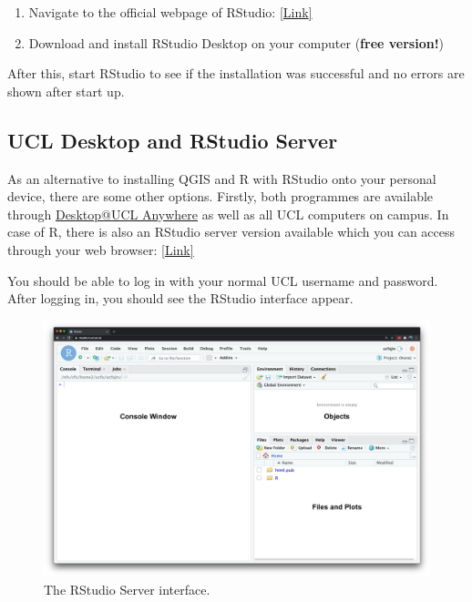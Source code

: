 \documentclass[
]{book}
\providecommand{\tightlist}{%
  \setlength{\itemsep}{0pt}\setlength{\parskip}{0pt}}
\begin{document}
\begin{enumerate}
\def\labelenumi{\arabic{enumi}.}
\tightlist
\item
  Navigate to the official webpage of RStudio: \href{https://posit.co/download/rstudio-desktop/\#download}{{[}Link{]}}
\item
  Download and install RStudio Desktop on your computer (\textbf{free version!})
\end{enumerate}

After this, start RStudio to see if the installation was successful and no errors are shown after start up.

\hypertarget{ucl}{%
\subsection{UCL Desktop and RStudio Server}\label{ucl}}

As an alternative to installing QGIS and R with RStudio onto your personal device, there are some other options. Firstly, both programmes are available through \href{https://www.ucl.ac.uk/isd/services/computers/remote-access/desktopucl-anywhere}{Desktop@UCL Anywhere} as well as all UCL computers on campus. In case of R, there is also an RStudio server version available which you can access through your web browser: \href{https://rstudio.data-science.rc.ucl.ac.uk/}{{[}Link{]}}

You should be able to log in with your normal UCL username and password. After logging in, you should see the RStudio interface appear.

\begin{figure}

{\centering \includegraphics[width=0.9\linewidth]{images/w01/rstudio_interface} 

}

\caption{The RStudio Server interface.}\label{fig:01-rstudio-interface}
\end{figure}
\end{document}

